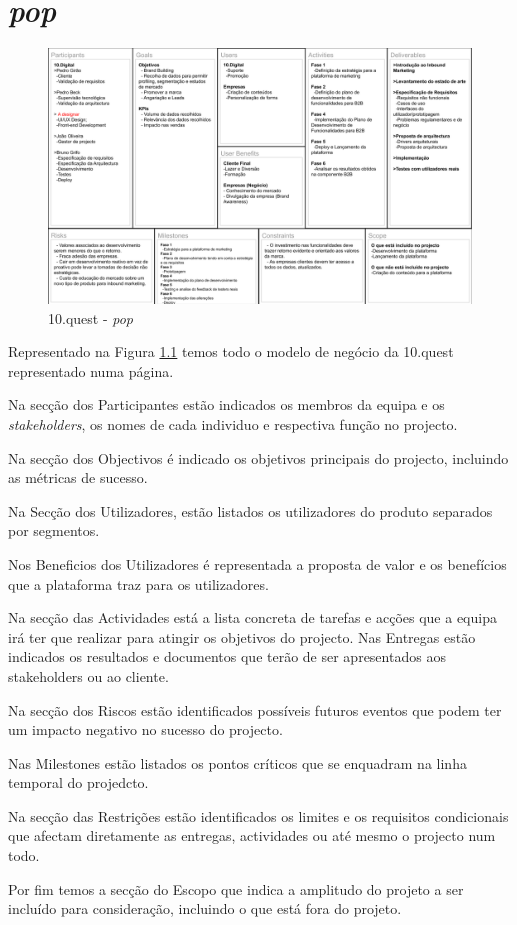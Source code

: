 \chapter{\textit{\gls{pop}}}
\label{a:bvm}

\begin{figure}[ht!]
	\begin{center}
		\includegraphics[width=1\textwidth]{img/bmc}
		\caption{10.quest - \textit{\gls{pop}}}
		\label{10q-bmc}
	\end{center}
\end{figure}

Representado na Figura \ref{10q-bmc} temos todo o modelo de negócio da 10.quest representado numa página.

Na secção dos Participantes estão indicados os membros da equipa e os \textit{stakeholders}, os nomes de cada individuo e respectiva função no projecto. 
 
Na secção dos Objectivos é indicado os objetivos principais do projecto, incluindo as métricas de sucesso. 
 
Na Secção dos Utilizadores, estão listados os utilizadores do produto separados por segmentos. 
 
Nos Beneficios dos Utilizadores é representada a proposta de valor e os benefícios que a plataforma traz para os utilizadores. 
 
Na secção das Actividades está a lista concreta de tarefas e acções que a equipa irá ter que realizar para atingir os objetivos do projecto. Nas Entregas estão indicados os resultados e documentos que terão de ser apresentados aos stakeholders ou ao cliente. 
 
Na secção dos Riscos estão identificados possíveis futuros eventos que podem ter um impacto negativo no sucesso do projecto. 
 
Nas Milestones estão listados os pontos críticos que se enquadram na linha temporal do projedcto. 

Na secção das Restrições estão identificados os limites e os requisitos condicionais que afectam diretamente as entregas, actividades ou até mesmo o projecto num todo. 

Por fim temos a secção do Escopo que indica a amplitudo do projeto a ser incluído para consideração, incluindo o que está fora do projeto.